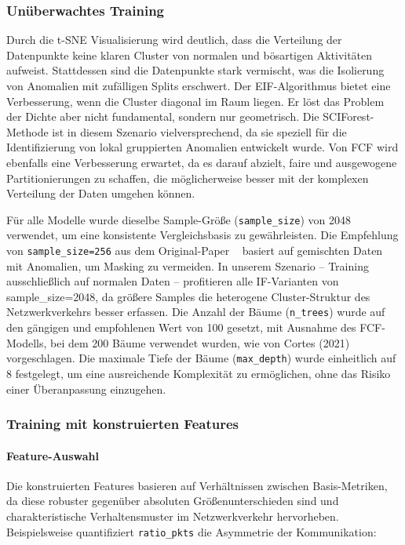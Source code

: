\documentclass[12pt,oneside]{article}
\begin{document}
	\subsubsection{Unüberwachtes Training}
	Durch die t-SNE Visualisierung wird deutlich, dass die Verteilung der Datenpunkte keine klaren Cluster von normalen und bösartigen Aktivitäten aufweist. Stattdessen sind die Datenpunkte stark vermischt, was die Isolierung von Anomalien mit zufälligen Splits erschwert. Der EIF-Algorithmus bietet eine Verbesserung, wenn die Cluster diagonal im Raum liegen. Er löst das Problem der Dichte aber nicht fundamental, sondern nur geometrisch. Die SCIForest-Methode ist in diesem Szenario vielversprechend, da sie speziell für die Identifizierung von lokal gruppierten Anomalien entwickelt wurde. Von FCF wird ebenfalls eine Verbesserung erwartet, da es darauf abzielt, faire und ausgewogene Partitionierungen zu schaffen, die möglicherweise besser mit der komplexen Verteilung der Daten umgehen können.

	Für alle Modelle wurde dieselbe Sample-Größe (\texttt{sample\_size}) von 2048 verwendet, um eine konsistente Vergleichsbasis zu gewährleisten. Die Empfehlung von \linebreak \texttt{sample\_size=256} aus dem Original-Paper ~\cite{Liu2008} basiert auf gemischten Daten mit Anomalien, um Masking zu vermeiden. In unserem Szenario – Training ausschließlich auf normalen Daten – profitieren alle IF-Varianten von sample\_size=2048, da größere Samples die heterogene Cluster-Struktur des Netzwerkverkehrs besser erfassen. Die Anzahl der Bäume (\texttt{n\_trees}) wurde auf den gängigen und empfohlenen Wert von 100 gesetzt, mit Ausnahme des FCF-Modells, bei dem 200 Bäume verwendet wurden, wie von Cortes (2021) ~\cite{cortes2021} vorgeschlagen. Die maximale Tiefe der Bäume (\texttt{max\_depth}) wurde einheitlich auf 8 festgelegt, um eine ausreichende Komplexität zu ermöglichen, ohne das Risiko einer Überanpassung einzugehen.
	\subsubsection{Training mit konstruierten Features}
	\paragraph{Feature-Auswahl}
	Die konstruierten Features basieren auf Verhältnissen zwischen Basis-Metriken, da diese robuster gegenüber absoluten Größenunterschieden sind und charakteristische Verhaltensmuster im Netzwerkverkehr hervorheben. Beispielsweise quantifiziert \texttt{ratio\_pkts} die Asymmetrie der Kommunikation:
\end{document}
